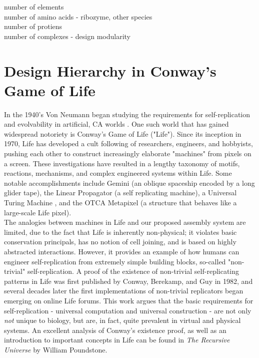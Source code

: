 {number of elements\\
number of amino acids - ribozyme, other species\\
number of protiens\\
number of complexes - design modularity\\



\section{Design Hierarchy in Conway's Game of Life}

In the 1940's Von Neumann began studying the requirements for self-replication and evolvability in artificial, CA worlds \cite{Neumann1966}.  One such world that has gained widespread notoriety is Conway's Game of Life ("Life").  Since its inception in 1970, Life has developed a cult following of researchers, engineers, and hobbyists, pushing each other to construct increasingly elaborate "machines" from pixels on a screen.  These investigations have resulted in a lengthy taxonomy of motifs, reactions, mechanisms, and complex engineered systems within Life.  Some notable accomplishments include Gemini (an oblique spaceship encoded by a long glider tape)\cite{Wade2010}, the Linear Propagator (a self replicating machine)\cite{Greene2013}, a Universal Turing Machine \cite{Rendell2000}, and the OTCA Metapixel (a structure that behaves like a large-scale Life pixel)\cite{Due2006}.\\

The analogies between machines in Life and our proposed assembly system are limited, due to the fact that Life is inherently non-physical; it violates basic conservation principals, has no notion of cell joining, and is based on highly abstracted interactions.  However, it provides an example of how humans can engineer self-replication from extremely simple building blocks, so-called "non-trivial" self-replication.  A proof of the existence of non-trivial self-replicating patterns in Life was first published by Conway, Berekamp, and Guy in 1982\cite{Berekamp1982}, and several decades later the first implementations of non-trivial replicators began emerging on online Life forums\cite{Greene2013a}.  This work argues that the basic requirements for self-replication - universal computation and universal construction - are not only \textit{not} unique to biology, but are, in fact, quite prevalent in virtual and physical systems.  An excellent analysis of Conway's existence proof, as well as an introduction to important concepts in Life can be found in \textit{The Recursive Universe} by William Poundstone\cite{Poundstone1985}.\\

}

